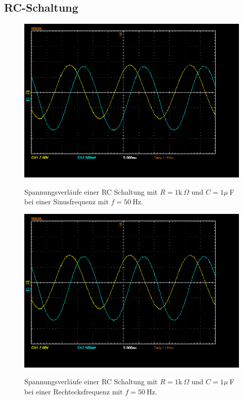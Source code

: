 \documentclass{article}
\begin{document}
\subsection{RC-Schaltung}

\begin{figure}[H]
\caption{Spannungsverläufe einer RC Schaltung mit $R=1$k$~\Omega$ und $C=1\mu~$F bei einer Sinusfrequenz mit $f=50~$Hz.}
{\centering
\includegraphics[scale=0.4]{winkler/Schaltung_1_Sinus.png}}
\end{figure}


\begin{figure}[H]
\caption{Spannungsverläufe einer RC Schaltung mit $R=1$k$~\Omega$ und $C=1\mu~$F bei einer Rechtecksfrequenz mit $f=50~$Hz.}
{\centering
\includegraphics[scale=0.4]{winkler/Schaltung_1_Sinus.png}}
\end{figure}
\end{document}
